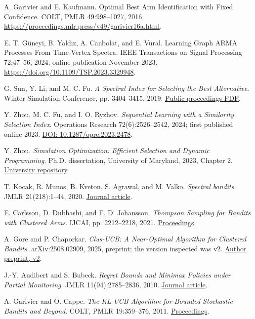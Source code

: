 A. Garivier and E. Kaufmann. Optimal Best Arm Identification with Fixed Confidence. COLT, PMLR 49:998--1027, 2016. \url{https://proceedings.mlr.press/v49/garivier16a.html}.

E. T. G\"uneyi, B. Yald\i z, A. Canbolat, and E. Vural. Learning Graph ARMA Processes From Time-Vertex Spectra. IEEE Transactions on Signal Processing 72:47--56, 2024; online publication November 2023. \url{https://doi.org/10.1109/TSP.2023.3329948}.

G. Sun, Y. Li, and M. C. Fu.
\emph{A Spectral Index for Selecting the Best Alternative}.
Winter Simulation Conference, pp. 3404--3415, 2019.
\href{https://www.informs-sim.org/wsc19papers/422.pdf}{Public proceedings PDF}.

Y. Zhou, M. C. Fu, and I. O. Ryzhov.
\emph{Sequential Learning with a Similarity Selection Index}.
Operations Research 72(6):2526--2542, 2024; first published online 2023.
\href{https://pubsonline.informs.org/doi/abs/10.1287/opre.2023.2478}{DOI: 10.1287/opre.2023.2478}.

Y. Zhou.
\emph{Simulation Optimization: Efficient Selection and Dynamic Programming}.
Ph.D. dissertation, University of Maryland, 2023, Chapter 2.
\href{https://drum.lib.umd.edu/items/b2a3657a-ca7c-4e1e-a132-af8a5e12f6f2}{University repository}.

T. Kocak, R. Munos, B. Kveton, S. Agrawal, and M. Valko.
\emph{Spectral bandits}.
JMLR 21(218):1--44, 2020.
\href{https://www.jmlr.org/papers/v21/16-529.html}{Journal article}.

E. Carlsson, D. Dubhashi, and F. D. Johansson.
\emph{Thompson Sampling for Bandits with Clustered Arms}.
IJCAI, pp. 2212--2218, 2021.
\href{https://www.ijcai.org/proceedings/2021/305}{Proceedings}.

A. Gore and P. Chaporkar.
\emph{Clus-UCB: A Near-Optimal Algorithm for Clustered Bandits}.
arXiv:2508.02909, 2025, preprint; the version inspected was v2.
\href{https://arxiv.org/html/2508.02909v2}{Author preprint, v2}.

J.-Y. Audibert and S. Bubeck.
\emph{Regret Bounds and Minimax Policies under Partial Monitoring}.
JMLR 11(94):2785--2836, 2010.
\href{https://www.jmlr.org/papers/v11/audibert10a.html}{Journal article}.

A. Garivier and O. Cappe.
\emph{The KL-UCB Algorithm for Bounded Stochastic Bandits and Beyond}.
COLT, PMLR 19:359--376, 2011.
\href{https://proceedings.mlr.press/v19/garivier11a.html}{Proceedings}.

